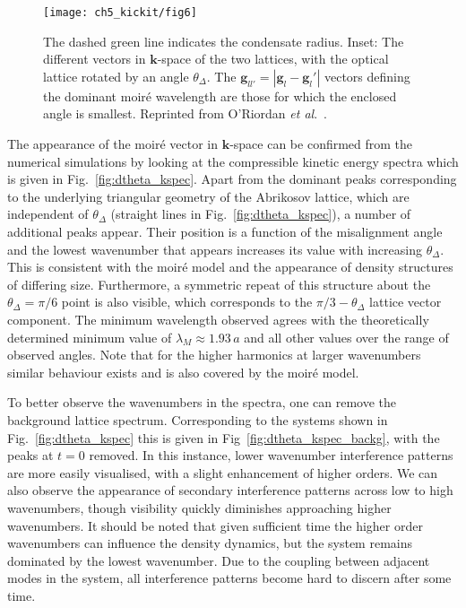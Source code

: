 \begin{figure}
    \centering
	\texttt{[image: ch5\_kickit/fig6]}
	\caption[Size of the resulting moir\'e super-structures as a function of the relative angle between the vortex and optical lattice.]{The dashed green line indicates the condensate radius. Inset: The different vectors in $\mathbf{k}$-space of the two lattices, with the optical lattice rotated by an angle $\theta_\Delta$. The $\mathbf{g}_{ll'} = |\mathbf{g}_l - \mathbf{g}_l'|$ vectors defining the dominant moir\'e wavelength are those for which the enclosed angle is smallest. Reprinted from O'Riordan {\textit{et al}.}~\cite{VTX:oriordan_pra_2016}.}
	\label{fig:moire_lambda_1}
\end{figure}

    The appearance of the moir\'e vector in $\mathbf{k}$-space can be confirmed from the numerical simulations by looking at the compressible kinetic energy spectra which is given in Fig.~\ref{fig:dtheta_kspec}. Apart from the dominant peaks corresponding to the underlying triangular geometry of the Abrikosov lattice, which are independent of $\theta_\Delta$ (straight lines in Fig.~\ref{fig:dtheta_kspec}), a number of additional peaks appear. Their position is a function of the misalignment angle and the lowest wavenumber that appears increases its value with increasing $\theta_\Delta$. This is consistent with the moir\'e model and the appearance of density structures of differing size. Furthermore, a symmetric repeat of this structure about the $\theta_\Delta=\pi/6$ point is also visible, which corresponds to the $\pi/3 - \theta_\Delta$ lattice vector component. The minimum wavelength observed agrees with the theoretically determined minimum value of $\lambda_M\approx 1.93\,a$ and all other values over the range of observed angles. Note that for the higher harmonics at larger wavenumbers similar behaviour exists and is also covered by the moir\'e model.

    To better observe the wavenumbers in the spectra, one can remove the background lattice spectrum. Corresponding to the systems shown in Fig.~\ref{fig:dtheta_kspec} this is given in Fig~\ref{fig:dtheta_kspec_backg}, with the peaks at $t=0$ removed. In this instance, lower wavenumber interference patterns are more easily visualised, with a slight enhancement of higher orders. We can also observe the appearance of secondary interference patterns across low to high wavenumbers, though visibility quickly diminishes approaching higher wavenumbers. It should be noted that given sufficient time the higher order wavenumbers can influence the density dynamics, but the system remains dominated by the lowest wavenumber. Due to the coupling between adjacent modes in the system, all interference patterns become hard to discern after some time. %

